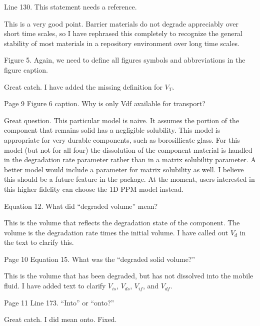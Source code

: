 \documentclass[answers,12pt]{exam}
\begin{document}
\begin{questions}
\question Line 130. This statement needs a reference.

\begin{solution}
This is a very good point. Barrier materials do not degrade appreciably over 
short time scales, so I have rephrased this completely to recognize the general 
stability of most materials in a repository environment over long time scales.  
\end{solution}

\question Figure 5. Again, we need to define all figures symbols and 
abbreviations in the figure caption.
\begin{solution}
Great catch. I have added the missing definition for $V_T$.  \end{solution}

\question Page 9 Figure 6 caption. Why is only Vdf available for transport?
\begin{solution}
Great question. This particular model is naive. It assumes the portion of the 
        component that remains solid  has a negligible solubility. This model 
        is appropriate for very durable components, such as borosillicate 
        glass.  For this model (but not for all four) the dissolution of the 
        component material is handled in the degradation rate parameter rather 
        than in a matrix solubility parameter. A better model would include a 
        parameter for matrix solubility as well. I believe this should be a 
        future feature in the package. At the moment, users interested in this 
        higher fidelity can choose the 1D PPM model instead. 
\end{solution}

\question Equation 12. What did ``degraded volume'' mean?
\begin{solution}
This is the volume that reflects the degradation state of the component. The 
        volume is the degradation rate times the initial volume. I have called 
        out $V_d$ in the text to clarify this.
\end{solution}

\question Page 10 Equation 15. What was the ``degraded solid volume?''
\begin{solution}
        This is the volume that has been degraded, but has not dissolved into 
        the mobile fluid. I have added text to clarify
        $V_{is}$,  $V_{ds}$, $V_{if}$, and
        $V_{df}$.  \end{solution}
 

\question Page 11 Line 173. ``Into'' or ``onto?''
\begin{solution}
Great catch. I did mean onto. Fixed.
\end{solution}


\end{questions}
\end{document}

